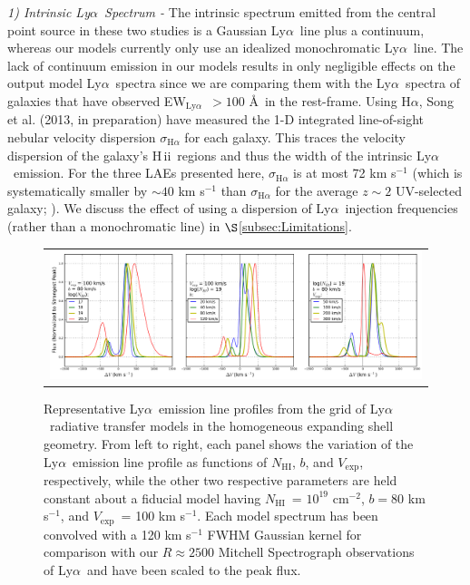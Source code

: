 \documentclass{emulateapj}
\newcommand{\lya}{Ly$\alpha$}
\newcommand{\ha}{H$\alpha$}
\def\nh{$N_{\mathrm{HI}}$}
\def\vexp{$V_{\mathrm{exp}}$}
\def\ewlya{EW$_{\mathrm{Ly}\alpha}$}
\def\hii{H\,{\sc ii}}
\begin{document}
\textit{1) Intrinsic \lya\ Spectrum -} The intrinsic spectrum emitted from the central point source in these two studies is a Gaussian \lya\ line plus a continuum, whereas our models currently only use an idealized monochromatic \lya\ line. The lack of continuum emission in our models results in only negligible effects on the output model \lya\ spectra since we are comparing them with the \lya\ spectra of galaxies that have observed \ewlya\ $>100$ \AA\ in the rest-frame. Using \ha, Song et al. (2013, in preparation) have measured the 1-D integrated line-of-sight nebular velocity dispersion $\sigma_{\mathrm{H}\alpha}$ for each galaxy. This traces the velocity dispersion of the galaxy's \hii\ regions and thus the width of the intrinsic \lya\ emission. For the three LAEs presented here, $\sigma_{\mathrm{H}\alpha}$ is at most 72 km s$^{-1}$ (which is systematically smaller by $\sim40$ km s$^{-1}$ than $\sigma_{\mathrm{H}\alpha}$ for the average $z\sim2$ UV-selected galaxy; \citealp{erb2006}). We discuss the effect of using a dispersion of \lya\ injection frequencies (rather than a monochromatic line) in $\S$\ref{subsec:Limitations}.

	\begin{figure}[t]
	\begin{center}
	\begin{tabular}{c}
	\includegraphics[width=17cm]{f5.png}
	\end{tabular}
	\end{center}
	\caption[example] 
	{ \label{fig:ExModelSpec} 
	Representative \lya\ emission line profiles from the grid of \lya\ radiative transfer models in the homogeneous expanding shell geometry. From left to right, each panel shows the variation of the \lya\ emission line profile as functions of \nh, $b$, and \vexp, respectively, while the other two respective parameters are held constant about a fiducial model having \nh\ = $10^{19}$ cm$^{-2}$, $b = 80$ km s$^{-1}$, and \vexp\ = 100 km s$^{-1}$. Each model spectrum has been convolved with a 120 km s$^{-1}$ FWHM Gaussian kernel for comparison with our $R\approx2500$ Mitchell Spectrograph observations of \lya\ and have been scaled to the peak flux.}
	\end{figure} 
\end{document}
